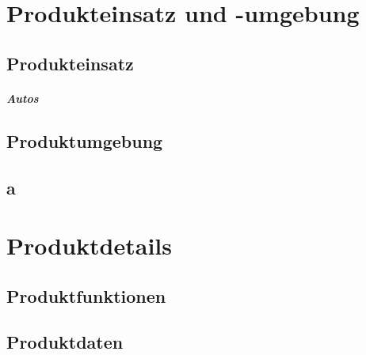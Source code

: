 \documentclass[pflichtenheft.tex]{subfiles}
\begin{document}
\chapter{Produkteinsatz und -umgebung}

\section{Produkteinsatz}
\paragraph{Autos}

\section{Produktumgebung}

\section{a}

\chapter{Produktdetails}

\section{Produktfunktionen}

\section{Produktdaten}
\end{document}
